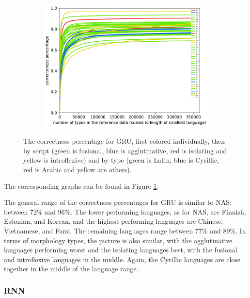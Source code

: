 \documentclass[11pt,a4paper,twoside,openright]{scrbook}
\begin{document}
\begin{figure}[h]
    \begin{subfigure}[b]{0.32\textwidth}
    	\centering
        \includegraphics[width=\textwidth]{graphs/gru/scripts/norm_huge_type_token_performance}
    \end{subfigure}
    \caption{The correctness percentage for GRU, first colored individually, then by script (green is fusional, blue is agglutinative, red is isolating and yellow is introflexive) and by type (green is Latin, blue is Cyrillic, red is Arabic and yellow are others).}
	\label{Figure:gru_norm_huge_type_token_performance}
\end{figure}

The corresponding graphs can be found in Figure \ref{Figure:gru_norm_huge_type_token_performance}.

The general range of the correctness percentages for GRU is similar to NAS: between 72\% and 96\%. The lower performing languages, as for NAS, are Finnish, Estonian, and Korean, and the highest performing languages are Chinese, Vietnamese, and Farsi. The remaining languages range between 77\% and 89\%. In terms of morphology types, the picture is also similar, with the agglutinative languages performing worst and the isolating languages best, with the fusional and introflexive languages in the middle. Again, the Cyrillic languages are close together in the middle of the language range. 
\subsubsection{RNN}
\end{document}
